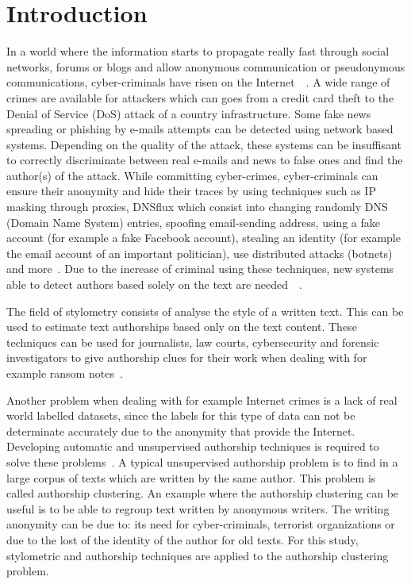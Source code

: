
\section{Introduction \label{sec:introduction}}

In a world where the information starts to propagate really fast through social networks, forums or blogs and allow anonymous communication or pseudonymous communications, cyber-criminals have risen on the Internet~\cite{automated_unsupervised}~\cite{kocher_pan16}.
A wide range of crimes are available for attackers which can goes from a credit card theft to the Denial of Service (DoS) attack of a country infrastructure.
Some fake news spreading or phishing by e-mails attempts can be detected using network based systems.
Depending on the quality of the attack, these systems can be insuffisant to correctly discriminate between real e-mails and news to false ones and find the author(s) of the attack.
While committing cyber-crimes, cyber-criminals can ensure their anonymity and hide their traces by using techniques such as IP masking through proxies, DNSflux which consist into changing randomly DNS (Domain Name System) entries, spoofing email-sending address, using a fake account (for example a fake Facebook account), stealing an identity (for example the email account of an important politician), use distributed attacks (botnets) and more~\cite{attribution_in_cyberspace}.
Due to the increase of criminal using these techniques, new systems able to detect authors based solely on the text are needed~\cite{automated_unsupervised}~\cite{unine_pan20_fake_news}.

The field of stylometry consists of analyse the style of a written text.
This can be used to estimate text authorships based only on the text content.
These techniques can be used for journalists, law courts, cybersecurity and forensic investigators to give authorship clues for their work when dealing with for example ransom notes~\cite{pan16_clustering_site}.

Another problem when dealing with for example Internet crimes is a lack of real world labelled datasets, since the labels for this type of data can not be determinate accurately due to the anonymity that provide the Internet.
Developing automatic and unsupervised authorship techniques is required to solve these problems~\cite{automated_unsupervised}.
A typical unsupervised authorship problem is to find in a large corpus of texts which are written by the same author.
This problem is called authorship clustering.
An example where the authorship clustering can be useful is to be able to regroup text written by anonymous writers.
The writing anonymity can be due to: its need for cyber-criminals, terrorist organizations or due to the lost of the identity of the author for old texts.
For this study, stylometric and authorship techniques are applied to the authorship clustering problem.

